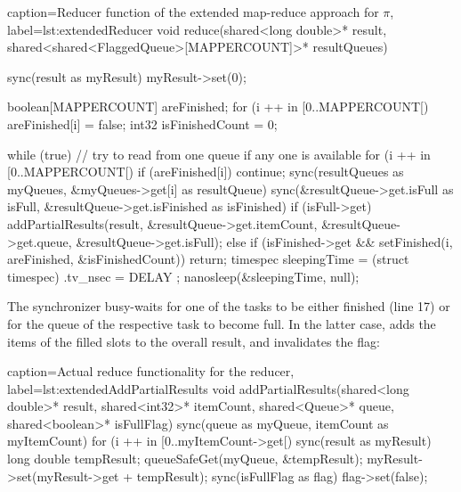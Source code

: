 \begin{ccode}{caption=Reducer function of the extended map-reduce approach for $\pi$, label=lst:extendedReducer}
void reduce(shared<long double>* result, shared<shared<FlaggedQueue>[MAPPERCOUNT]>* resultQueues) { 
  sync(result as myResult) { myResult->set(0); } 
   
  boolean[MAPPERCOUNT] areFinished; 
  for (i ++ in [0..MAPPERCOUNT[) { areFinished[i] = false; }
  int32 isFinishedCount = 0; 
   
  while (true) { 
    // try to read from one queue if any one is available  
    for (i ++ in [0..MAPPERCOUNT[) { 
      if (areFinished[i]) { continue; }
      sync(resultQueues as myQueues, &myQueues->get[i] as resultQueue) {
        sync(&resultQueue->get.isFull as isFull, &resultQueue->get.isFinished as isFinished) { 
          if (isFull->get) { 
            addPartialResults(result, &resultQueue->get.itemCount, &resultQueue->get.queue, 
                              &resultQueue->get.isFull); 
          } else if (isFinished->get && setFinished(i, areFinished, &isFinishedCount)) { 
            return; 
          } 
        } 
      } 
    }
    timespec sleepingTime = (struct timespec){ .tv_nsec = DELAY }; 
    nanosleep(&sleepingTime, null); 
  }
}
\end{ccode}
The synchronizer busy-waits for one of the tasks to be either finished (line 17) or for the queue of the respective task to become full. In the latter case,  adds the items of the filled slots to the overall result, and invalidates the  flag:
\begin{ccode}{caption=Actual reduce functionality for the reducer, label=lst:extendedAddPartialResults}
void addPartialResults(shared<long double>* result, shared<int32>* itemCount, 
                       shared<Queue>* queue, shared<boolean>* isFullFlag) {
  sync(queue as myQueue, itemCount as myItemCount) { 
    for (i ++ in [0..myItemCount->get[) {
      sync(result as myResult) { 
        long double tempResult; 
        queueSafeGet(myQueue, &tempResult); 
        myResult->set(myResult->get + tempResult); 
      } 
    }
  } 
  sync(isFullFlag as flag) { flag->set(false); } 
}
\end{ccode}
